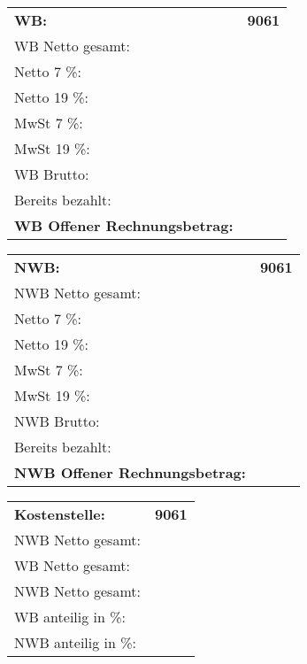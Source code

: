 \documentclass[a4paper]{article}
\begin{document}
			\vspace{1cm}
			
			\begin{tabular}{v{0.9\textwidth}r}
				\color{white} \textbf{WB:} &  \color{white} \textbf{9061} \\
				
				WB Netto gesamt:		&  \\
				\hline
				Netto  7 \%:			&  \\
				Netto 19 \%:			&  \\
				MwSt 7 \%:			&  \\
				MwSt 19 \%:			&  \\
				  \hline
				WB Brutto:			&  \\
				  \hline
				Bereits bezahlt:			&  \\
				  \hline
				\textbf{WB Offener Rechnungsbetrag:}& \textbf{} \\
				  \hline  \hline
			\end{tabular}
			
			\vspace{1cm}
			
			\begin{tabular}{v{0.9\textwidth}r}
				\color{white} \textbf{NWB:} &  \color{white} \textbf{9061} \\
				
				NWB Netto gesamt:		&  \\
				\hline
				Netto  7 \%:			&  \\
				Netto 19 \%:			&  \\
				MwSt 7 \%:			&  \\
				MwSt 19 \%:			&  \\
				  \hline
				NWB Brutto:			&  \\
				  \hline
				Bereits bezahlt:			&  \\
				  \hline
				\textbf{NWB Offener Rechnungsbetrag:}& \textbf{} \\
				  \hline  \hline
			\end{tabular}

			\vspace{1cm}
			
			\begin{tabular}{v{0.9\textwidth}r}
				\color{white} \textbf{Kostenstelle:} &  \color{white} \textbf{9061} \\
				
				NWB Netto gesamt:		&  \\
				\hline
				WB Netto gesamt:		&  \\
				\hline
				NWB Netto gesamt:		&  \\
				\hline
				WB anteilig in \%:		&  \\
				\hline
				NWB anteilig in \%:		&  \\
			\end{tabular}
\end{document}
